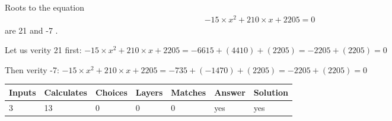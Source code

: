 \documentclass[12pt]{article}
\begin{document}
 

 
 
 
\noindent{}
 
 

Roots to the equation
\begin{eqnarray*}
-15 \times x^2  %
+  %
210
                 \times x    %
+  %
2205 =0
\end{eqnarray*}
are  %
21 and  %
-7 .
 
Let us verity  %
21 first:
$  %
-15 \times x^2  %
+  %
210
                 \times x    %
+  %
2205
  = %
-6615+( %
4410)+( %
2205)
  = %
-2205+( %
2205)
  = %
0
$
 
Then verity  %
-7:
$  %
-15 \times x^2  %
+  %
210
                 \times x    %
+  %
2205
  = %
-735+( %
-1470)+( %
2205)
  = %
-2205+( %
2205)
  = %
0
$
 
 
 
\noindent{}
 
 

 
\vspace{0.3in}
   
   
   
   
\noindent\begin{tabular}{|l|l|l|l|l|l|l|}
 \hline
Inputs & Calculates & Choices & Layers & Matches & Answer & Solution \\ \hline
           3 & 
          13 & 
           0
  & 
           0 & 
           0 & 
  yes & 
  yes 
  \\ \hline
 \end{tabular}
   
   
   
   
\noindent{}
   
   
  
\end{document}
